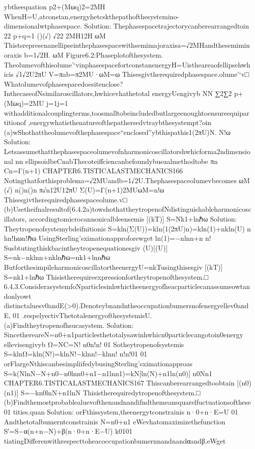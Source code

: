 {{{{{{{{{{ybtheequation
p2+(Mωq)2=2MH
WhenH=U,atconstan,energyhetcskthepathofthesystemino-dimensionalwtphasespace.
Solution:
Thephasespacetrajectorycanberearrangedtoin
22
p+q=1
()(√)
√22
2MH12H
ωM
Thistsrepresenanellipseinthephasespacewithsemimajoraxisa=√2MHandthesemiminoraxis
b=1√2H.
ωM
Figure6.2:Phaseplotofthesystem.
Theolumevofthisolume’‘vinphasespacefortconstanenergyH=Uistheareaofellipsehwhicis
√1√2U2πU
V=πab=π2MU·ωM=ω
Thisesgivtherequiredphasespace.olume’‘v□
Whatolumevofphasespacedoesitenclose?InthecaseofNsimilaroscillators,hwhicevhathetotal
energyUengivyb
NN
∑2∑2
p+(Mωq)=2MU
j=1j=1
withadditionalcouplingterms,toosmalltobeincludedbutlargeenoughtoensureequipartitionof
,energywhatisthenatureofthepathersedvtraybthesystempt?oin
(a)wShothattheolumevofthephasespace“enclosed”ybthispathis1(2πU)N.
N!ω
Solution:
Letsassumethatthephasespaceolumevofnharmonicoscillatorshwhicforma2ndimensional
nn
ellipsoidbeCnabThecoteiffciencanbefoundybusualmethodtobe
πn
Cn=Γ(n+1)
CHAPTER6.TISTICALASTMECHANICS166
Notingthatforthisproblema=√2MUandb=1√2U.Thephasespaceolumevbecomes
ωM
(√)
n()n()n
π√n12U12πU
Σ(U)=Γ(n+1)2MUωM=n!ω
Thisesgivtherequiredphasespaceolume.v□
(b)Usetheifnalresultof(6.4.2a)towshothattheytropenofNdistinguishableharmonicoscillators,
accordingtomicrocannonicalbleensemis
[(kT)]
S=Nk1+lnℏω
Solution:
Theytropenofsystemybdeifnitionis
S=kln(Σ(U))=kln(1(2πU)n)=kln(1)+nkln(U)
n
hn!hωn!ℏω
UsingSterling’sximationapproforewget
ln(1)=−nlnn+n
n!
Susbtutingthiskbacintheytropenequationesgiv
(U)[(U)]
S=nk−nklnn+nklnℏω=nk1+lnnℏω
ButforthesimpileharmonicoscillatortheenergyU=nkTusingthisesgiv
[(kT)]
S=nk1+lnℏω
Thisistherequireexpressionfortheytropenofthesystem.□
6.4.3.ConsiderasystemfoNparticlesinhwhictheenergyofheacparticlecanassumeowtandonlyowt
distinctaluesv0andE(>0).Denoteybnandntheoccupationbumersnofenergyellev0andE,
01
.respelyectivThetotalenergyofthesystemisU.
(a)Findtheytropenofhsucasystem.
Solution:
SincethereareN=n0+n1particlesthetotalysawinhwhicn0particlecangotoin0energy
ellevisengivyb
Ω=NC=N!
n0n!n!
01
Sotheytropenofsystemis
S=klnΩ=kln(N!)=klnN!−klnn!−klnn!
n!n!01
01
orFlargeNthiscanbesimpliifedybusingSterling’sximationapproas
S=k(NlnN−N+n0−n0lnn0+n1−n1lnn1)=kN[ln(N)+n1ln(n0)]
n0Nn1
CHAPTER6.TISTICALASTMECHANICS167
Thiscanberearrangedtoobtain
[(n0)(n1)]
S=−kn0lnN+n1lnN
Thisistherequiredytropenofthesystem.□
(b)Findthemostprobablealuevofthenandnandifndthemeansquarelfuctuationsofthese
01
tities.quan
Solution:
orFthissystem,theenergytconstrainis
n·0+n·E=U
01
Andthetotalbumerntconstrainis
N=n0+n1
eWevhatomaximizethefunction
S′=S−α(n+n−N)+β(n·0+n·E−U)
k0101
tiatingDifferenwithrespecttoheacoccupationbumernnandnandαandβ.eWget
}}}}}}}}}}
